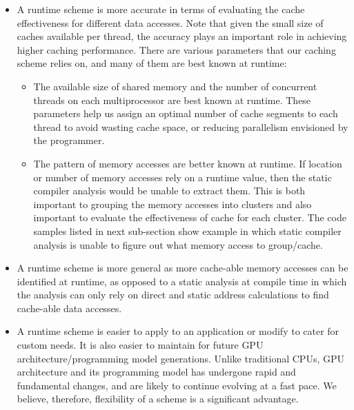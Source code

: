 \begin{itemize}

\item A runtime scheme is more accurate in terms of evaluating the cache effectiveness for different data accesses.
Note that given the small size of caches available per thread, the accuracy plays an important role in achieving higher
caching performance. There are various parameters that our caching scheme relies on, and many of them are best known
at runtime:

	\begin{itemize}

	\item The available size of shared memory and the number of concurrent threads on each multiprocessor are best
known at runtime. These parameters help us assign an optimal number of cache segments to each thread to avoid wasting
cache space, or reducing parallelism envisioned by the programmer.

	\item The pattern of memory accesses are better known at runtime. If location or number of memory accesses rely
on a runtime value, then the static compiler analysis would be unable to extract them. This is both important to
grouping the memory accesses into clusters and also important to evaluate the effectiveness of cache for each cluster.
The code samples listed in next sub-section show example in which static compiler analysis is unable to figure out what
memory access to group/cache.

	\end{itemize}

\item A runtime scheme is more general as more cache-able memory accesses can be identified at runtime, as opposed to a
static analysis at compile time in which the analysis can only rely on direct and static address calculations to find
cache-able data accesses.


\item A runtime scheme is easier to apply to an application or modify to cater for custom needs. It is also easier to
maintain for future GPU architecture/programming model generations. Unlike traditional CPUs, GPU architecture and its
programming model has undergone rapid and fundamental changes, and are likely to continue evolving at a fast pace. We
believe, therefore, flexibility of a scheme is a significant advantage.

\end{itemize}

